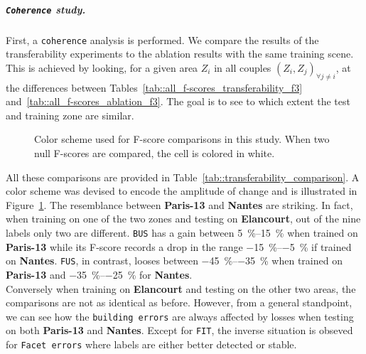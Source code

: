         \subparagraph{\texttt{Coherence} study.}
            First, a \texttt{coherence} analysis is performed.
            We compare the results of the transferability experiments to the ablation results with the same training scene.
            This is achieved by looking, for a given area $Z_i$ in all couples $(Z_i, Z_j)_{\forall j \neq i}$, at the differences between Tables~\ref{tab::all_f-scores_transferability_f3} and~\ref{tab::all_f-scores_ablation_f3}.
            The goal is to see to which extent the test and training zone are similar.\\

            \begin{figure}[htb]
                \centering
                
                \caption[
                    Color scheme used for F-score comparisons in this study.
                ]{
                    \label{fig::comparison_bar}
                    Color scheme used for F-score comparisons in this study.
                    When two null F-scores are compared, the cell is colored in white.
                }
            \end{figure}

            All these comparisons are provided in Table~\ref{tab::transferability_comparison}.
            A color scheme was devised to encode the amplitude of change and is illustrated in Figure~\ref{fig::comparison_bar}.
            The resemblance between \textbf{Paris-13} and \textbf{Nantes} are striking.
            In fact, when training on one of the two zones and testing on \textbf{Elancourt}, out of the nine labels only two are different.
            \texttt{BUS} has a gain between \SIrange[range-phrase={ and }]{5}{15}{\percent} when trained on \textbf{Paris-13} while its F-score records a drop in the range \SIrange{-15}{-5}{\percent} if trained on \textbf{Nantes}.
            \texttt{FUS}, in contrast, looses between \SIrange[range-phrase={ and }]{-45}{-35}{\percent} when trained on \textbf{Paris-13} and \SIrange[range-phrase={ and }]{-35}{-25}{\percent} for \textbf{Nantes}.\\
            Conversely when training on \textbf{Elancourt} and testing on the other two areas, the comparisons are not as identical as before.
            However, from a general standpoint, we can see how the \texttt{building errors} are always affected by losses when testing on both \textbf{Paris-13} and \textbf{Nantes}.
            Except for \texttt{FIT}, the inverse situation is obseved for \texttt{Facet errors} where labels are either better detected or stable.


